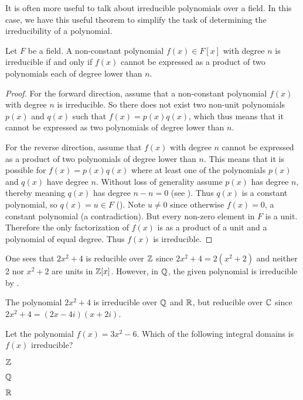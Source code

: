 It is often more useful to talk about irreducible polynomials over a field. In this case, we have this useful theorem to simplify the task of determining the irreducibility of a polynomial.
\begin{theorem}\label{thrm-irreducible-iff-not-expressable-as-product-of-smaller-polynomials}
    Let $F$ be a field. A non-constant polynomial $f(x) \in F[x]$ with degree $n$ is irreducible if and only if $f(x)$ cannot be expressed as a product of two polynomials each of degree lower than $n$.
\end{theorem}
\begin{proof}
    For the forward direction, assume that a non-constant polynomial $f(x)$ with degree $n$ is irreducible. So there does not exist two non-unit polynomials $p(x)$ and $q(x)$ such that $f(x) = p(x)q(x)$, which thus means that it cannot be expressed as two polynomials of degree lower than $n$.

    For the reverse direction, assume that $f(x)$ with degree $n$ cannot be expressed as a product of two polynomials of degree lower than $n$. This means that it is possible for $f(x) = p(x)q(x)$ where at least one of the polynomials $p(x)$ and $q(x)$ have degree $n$. Without loss of generality assume $p(x)$ has degree $n$, thereby meaning $q(x)$ has degree $n - n = 0$ (see ). Thus $q(x)$ is a constant polynomial, so $q(x) = u \in F$ (). Note $u \neq 0$ since otherwise $f(x) = 0$, a constant polynomial (a contradiction). But every non-zero element in $F$ is a unit. Therefore the only factorization of $f(x)$ is as a product of a unit and a polynomial of equal degree. Thus $f(x)$ is irreducible.
\end{proof}

\begin{example}
    One sees that $2x^2 + 4$ is reducible over $\mathbb{Z}$ since $2x^2 + 4 = 2(x^2 + 2)$ and neither 2 nor $x^2 + 2$ are units in $\mathbb{Z}[x]$. However, in $\mathbb{Q}$, the given polynomial is irreducible by .
\end{example}

\begin{example}
    The polynomial $2x^2 + 4$ is irreducible over $\mathbb{Q}$ and $\mathbb{R}$, but reducible over $\mathbb{C}$ since $2x^2 + 4 = (2x-4i)(x+2i)$.
\end{example}

\begin{exercise}
    Let the polynomial $f(x) = 3x^2 - 6$. Which of the following integral domains is $f(x)$ irreducible?
    \begin{partquestions}{\alph*}
        \item $\mathbb{Z}$
        \item $\mathbb{Q}$
        \item $\mathbb{R}$
    \end{partquestions} 
\end{exercise}

